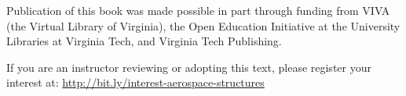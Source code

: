 \documentclass{AeroStructure-ERJohnson}
\begin{document}
\frontmatter


\begin{seriespage}
Publication of this book was made possible in part through funding from VIVA (the Virtual
Library of Virginia), the Open Education Initiative at the University Libraries at Virginia
Tech, and Virginia Tech Publishing.

If you are an instructor reviewing or adopting this text, please
register your interest at:
\url{http://bit.ly/interest-aerospace-structures}
\end{seriespage}





\logo

\clearpage
\end{document}
